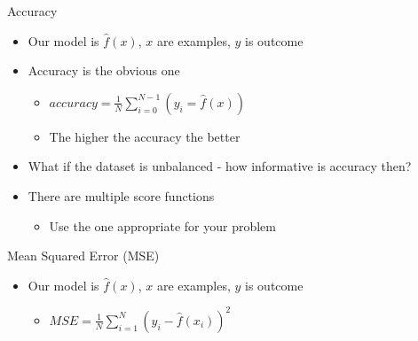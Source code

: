 \documentclass[obeyspaces,aspectratio=43]{beamer}
\providecommand{\tightlist}{%
  \setlength{\itemsep}{0pt}\setlength{\parskip}{0pt}}
\begin{document}
\begin{frame}{Accuracy}

\begin{itemize}
\tightlist
\item
  Our model is \(\hat{f}(x)\), \(x\) are examples, \(y\) is outcome
\item
  Accuracy is the obvious one

  \begin{itemize}
  \tightlist
  \item
    \(\mathit{accuracy} = \frac{1} {N} \sum\limits_{i=0}^{N-1}(y_i = \hat{f}(x) )\)
  \item
    The higher the accuracy the better
  \end{itemize}
\item
  What if the dataset is unbalanced - how informative is accuracy then?
\item
  There are multiple score functions

  \begin{itemize}
  \tightlist
  \item
    Use the one appropriate for your problem
  \end{itemize}
\end{itemize}

\end{frame}

\begin{frame}{Mean Squared Error (MSE)}

\begin{itemize}
\tightlist
\item
  Our model is \(\hat{f}(x)\), \(x\) are examples, \(y\) is outcome

  \begin{itemize}
  \tightlist
  \item
    \(MSE = \frac{1} {N} \sum\limits_{i = 1}^N \left( y_{i} - \hat{f}(x_{i}) \right)^2\)
  \end{itemize}
\end{itemize}

\end{frame}
\end{document}
